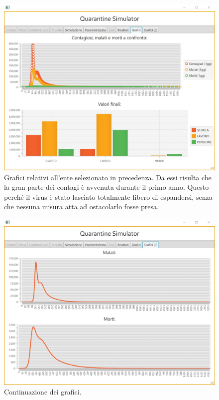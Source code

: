 \documentclass[a4paper, 12pt]{article}
\begin{document}
\begin{figure}[H]
	\centering
	\includegraphics[height=0.4\textheight]{IMG/4.jpg}
	\caption[App: Tab Grafici (1)]{Grafici relativi all'ente selezionato in precedenza. Da essi risulta che la gran parte dei contagi è avvenuta durante il primo anno. Questo perché il virus è stato lasciato totalmente libero di espandersi, senza che nessuna misura atta ad ostacolarlo fosse presa.}
	\label{fig:screen4}
\end{figure}

\begin{figure}[H]
	\centering
	\includegraphics[height=0.4\textheight]{IMG/5.jpg}
	\caption[App: Tab Grafici (2)]{Continuazione dei grafici.}
	\label{fig:screen5}
\end{figure}
		
\end{document}
